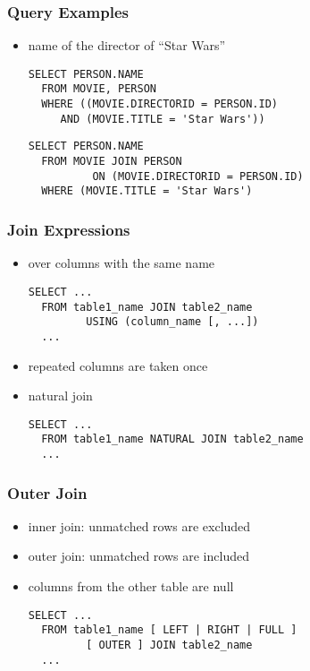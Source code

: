 \documentclass[dvipsnames]{beamer}
\theoremstyle{plain}
\begin{document}
\begin{frame}[fragile]
  \frametitle{Query Examples}

  \begin{itemize}
    \item name of the director of ``Star Wars''
    \begin{lstlisting}
SELECT PERSON.NAME
  FROM MOVIE, PERSON
  WHERE ((MOVIE.DIRECTORID = PERSON.ID)
     AND (MOVIE.TITLE = 'Star Wars'))
    \end{lstlisting}

    \pause
    \begin{lstlisting}
SELECT PERSON.NAME
  FROM MOVIE JOIN PERSON
          ON (MOVIE.DIRECTORID = PERSON.ID)
  WHERE (MOVIE.TITLE = 'Star Wars')
    \end{lstlisting}
  \end{itemize}
\end{frame}

\begin{frame}[fragile]
  \frametitle{Join Expressions}

  \begin{itemize}
    \item over columns with the same name
    \begin{lstlisting}
SELECT ...
  FROM table1_name JOIN table2_name
         USING (column_name [, ...])
  ...
    \end{lstlisting}
    \item repeated columns are taken once

    \pause
    \medskip
    \item natural join
    \begin{lstlisting}
SELECT ...
  FROM table1_name NATURAL JOIN table2_name
  ...
    \end{lstlisting}
  \end{itemize}
\end{frame}

\begin{frame}[fragile]
  \frametitle{Outer Join}

  \begin{itemize}
    \item inner join: unmatched rows are excluded

    \medskip
    \item \alert{outer join}: unmatched rows are included
    \item columns from the other table are null
    \begin{lstlisting}
SELECT ...
  FROM table1_name [ LEFT | RIGHT | FULL ]
         [ OUTER ] JOIN table2_name
  ...
    \end{lstlisting}
  \end{itemize}
\end{frame}
\end{document}
